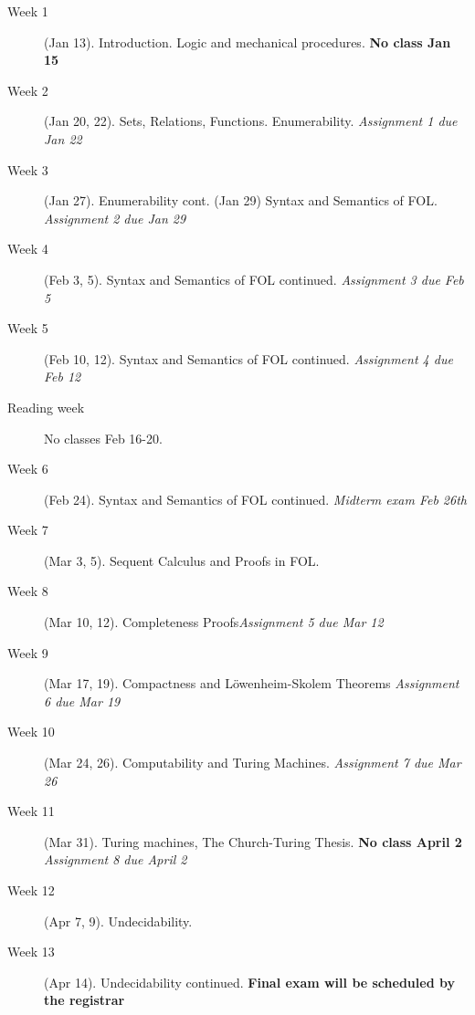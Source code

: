  
\begin{description}
\item[Week 1] (Jan 13). Introduction. Logic and mechanical procedures. \textbf{No class Jan 15}

\item[Week 2] (Jan 20, 22). Sets, Relations, Functions. Enumerability. \emph{Assignment 1 due Jan 22}

\item[Week 3] (Jan 27). Enumerability cont. (Jan 29) Syntax and Semantics of FOL. \emph{Assignment 2 due Jan 29}

\item[Week 4] (Feb 3, 5). Syntax and Semantics of FOL continued. \emph{Assignment 3 due Feb 5}

\item[Week 5] (Feb 10, 12). Syntax and Semantics of FOL continued. \emph{Assignment 4 due Feb 12}

\item[Reading week] No classes Feb 16-20.

\item[Week 6] (Feb 24). Syntax and Semantics of FOL continued.  \emph{Midterm exam Feb 26th}

\item[Week 7] (Mar 3, 5). Sequent Calculus and Proofs in FOL.

\item[Week 8] (Mar 10, 12). Completeness Proofs\emph{Assignment 5 due Mar 12}

\item[Week 9] (Mar 17, 19). Compactness and L\"owenheim-Skolem Theorems \emph{Assignment 6 due Mar 19}

\item[Week 10] (Mar 24, 26). Computability and Turing Machines. \emph{Assignment 7 due Mar 26}

\item[Week 11] (Mar 31). Turing machines, The Church-Turing Thesis. \textbf{No class April 2} \emph{Assignment 8 due April 2}

\item[Week 12] (Apr 7, 9). Undecidability.

\item[Week 13] (Apr 14). Undecidability continued. \textbf{Final exam will be scheduled by the registrar}
\end{description}

